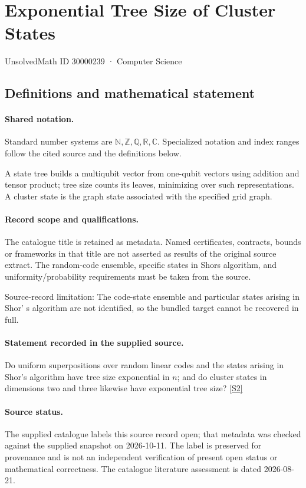 \documentclass[11pt]{article}
\newcommand{\sref}[2]{\hyperlink{source:#1:#2}{[S#2]}}
\begin{document}
\setcounter{section}{30000238}
\section{Exponential Tree Size of Cluster States}\label{30000239}
{\small\sffamily UnsolvedMath ID 30000239 · Computer Science}
\subsection{Definitions and mathematical statement}

\paragraph{Shared notation.}Standard number systems are $\mathbb N,\mathbb Z,\mathbb Q,\mathbb R,\mathbb C$. Specialized notation and index ranges follow the cited source and the definitions below.


A state tree builds a multiqubit vector from one-qubit vectors using addition and tensor product; tree size counts its leaves, minimizing over such representations. A cluster state is the graph state associated with the specified grid graph.
\paragraph{Record scope and qualifications.}
The catalogue title is retained as metadata. Named certificates, contracts, bounds or frameworks in that title are not asserted as results of the original source extract.
The random-code ensemble, specific states in Shor\textquotesingle s algorithm, and uniformity/probability requirements must be taken from the source.

Source-record limitation: The code-state ensemble and particular states arising in Shor' s algorithm are not identified, so the bundled target cannot be recovered in full.
\paragraph{Statement recorded in the supplied source.}
Do uniform superpositions over random linear codes and the states arising in Shor's algorithm have tree size exponential in $n$; and do cluster states in dimensions two and three likewise have exponential tree size? \sref{30000239}{2}
\paragraph{Source status.}
The supplied catalogue labels this source record open; that metadata was checked against the supplied snapshot on 2026-10-11. The label is preserved for provenance and is not an independent verification of present open status or mathematical correctness. The catalogue literature assessment is dated 2026-08-21.
\end{document}
